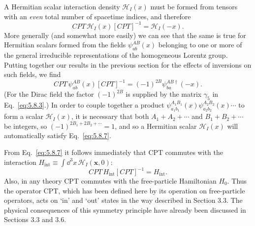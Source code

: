 A Hermitian scalar interaction density $\mathcal H_I(x)$ must be formed from
tensors with an \emph{even} total number of spacetime indices, and therefore
\begin{equation}
CPT\,\mathcal H_I(x)[CPT]^{-1}=\mathcal H_I(-x).
\tag{5.8.7}\label{eq:5.8.7}
\end{equation}
More generally (and somewhat more easily) we can see that the same is true for
Hermitian scalars formed from the fields $\psi^{AB}_{ab}(x)$ belonging to one
or more of the general irreducible representations of the homogeneous Lorentz
group. Putting together our results in the previous section for the effects of
inversions on such fields, we find
\begin{equation}
CPT\,\psi^{AB}_{ab}(x)[CPT]^{-1}=(-1)^{2B}
\psi^{AB\dagger}_{ba}(-x).
\tag{5.8.8}\label{eq:5.8.8}
\end{equation}
(For the Dirac field the factor $(-1)^{2B}$ is supplied by the matrix
$\gamma_5$ in Eq.~\eqref{eq:5.8.3}.) In order to couple together a product
$\psi^{A_1B_1}_{a_1b_1}(x)\psi^{A_2B_2}_{a_2b_2}(x)\cdots$ to form a scalar
$\mathcal H_I(x)$, it is necessary that both $A_1+A_2+\cdots$ and
$B_1+B_2+\cdots$ be integers, so
$(-1)^{2B_1+2B_2+\cdots}=1$, and so a Hermitian scalar $\mathcal H_I(x)$ will
automatically satisfy Eq.~\eqref{eq:5.8.7}.

From Eq.~\eqref{eq:5.8.7} it follows immediately that CPT commutes with the interaction
$H_{\mathrm{int}}\equiv\int \dd^3x\,\mathcal H_I(\mathbf x,0)$:
\begin{equation}
CPT\,H_{\mathrm{int}}[CPT]^{-1}=H_{\mathrm{int}}.
\tag{5.8.9}\label{eq:5.8.9}
\end{equation}
Also, in any theory CPT commutes with the free-particle Hamiltonian $H_0$.
Thus the operator CPT, which has been defined here by its operation on
free-particle operators, acts on `in' and `out' states in the way described in
Section 3.3. The physical consequences of this symmetry principle have already
been discussed in Sections 3.3 and 3.6.
